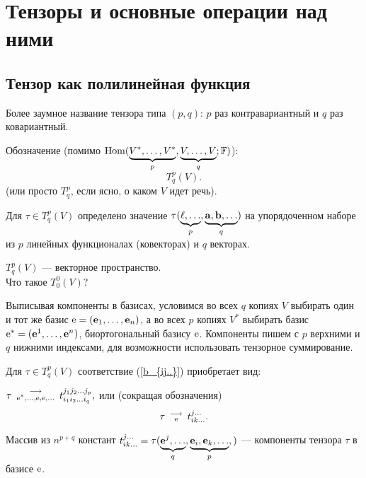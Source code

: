 
\section{Тензоры и основные операции над ними}


\subsection{Тензор как полилинейная функция}



Более заумное название тензора типа $(p,q)$: $p$ раз контравариантный и $q$ раз ковариантный.

Обозначение (помимо $\mathop{\rm Hom}\nolimits( \underbrace{V^*, \ldots , V^*}_{p}, \underbrace{V, \ldots , V}_{q}; \mathbb{F})$):
$$T^p_q(V).$$ 
(или просто $T^p_q$, если ясно, о каком $V$ идет речь).

Для $\tau \in T^p_q(V)$ определено значение $\tau (\underbrace{\ell, \ldots }_{p}, \underbrace{\mathbf{a}, 
\mathbf{b}, \ldots }_{q})$ на упорядоченном наборе из $p$ линейных функционалах (ковекторах) и $q$ векторах.

$T^p_q(V)$ --- векторное пространство. \\
Что такое $T^0_0(V)$?

Выписывая компоненты в базисах, условимся во всех $q$ копиях $V$ выбирать один и тот же базис 
$\mathrm{e} = (\mathbf{e}_1, \ldots, \mathbf{e}_n)$, а во всех 
$p$ копиях $V^*$ выбирать базис
$\mathrm{e}^* = (\mathbf{e}^1, \ldots, \mathbf{e}^n)$, биортогональный базису $\mathrm{e}$.
Компоненты пишем с $p$ верхними и $q$ нижними индексами, для возможности использовать тензорное суммирование.
 
Для $\tau \in T^p_q(V)$ соответствие (\ref{b_{ij..}}) приобретает вид:

$\tau \, \, \begin{smallmatrix} \longrightarrow \\ \mathrm{e}^*, \ldots , \mathrm{e}, \mathrm{e}, \ldots  \end{smallmatrix} \, \,  
t_{i_1i_2 \ldots i_q}^{j_1j_2\ldots j_p},  $
или (сокращая обозначения)
$$\tau \, \, \begin{smallmatrix} \longrightarrow \\ \mathrm{e} \end{smallmatrix} \, \,  
t_{ik \ldots }^{j\ldots }.  $$

Массив из $n^{p+q}$ констант $t_{ik \ldots }^{j\ldots } = \tau 
(\underbrace{\mathbf{e}^j, \ldots  }_q, \underbrace{\mathbf{e}_i, \mathbf{e}_k, \ldots }_p, )$ --- 
компоненты тензора $\tau $  в базисе $\mathrm{e}$.

